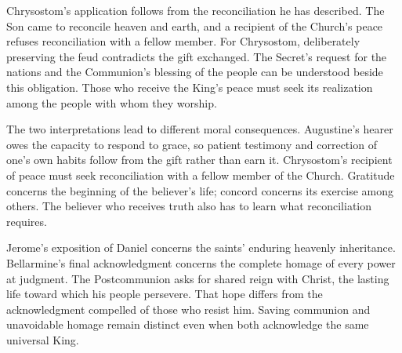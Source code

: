 Chrysostom's application follows from the reconciliation he has described. The Son came to reconcile heaven and earth, and a recipient of the Church's peace refuses reconciliation with a fellow member. For Chrysostom, deliberately preserving the feud contradicts the gift exchanged. The Secret's request for the nations and the Communion's blessing of the people can be understood beside this obligation. Those who receive the King's peace must seek its realization among the people with whom they worship.

The two interpretations lead to different moral consequences. Augustine's hearer owes the capacity to respond to grace, so patient testimony and correction of one's own habits follow from the gift rather than earn it. Chrysostom's recipient of peace must seek reconciliation with a fellow member of the Church. Gratitude concerns the beginning of the believer's life; concord concerns its exercise among others. The believer who receives truth also has to learn what reconciliation requires.

Jerome's exposition of Daniel concerns the saints' enduring heavenly inheritance. Bellarmine's final acknowledgment concerns the complete homage of every power at judgment. The Postcommunion asks for shared reign with Christ, the lasting life toward which his people persevere. That hope differs from the acknowledgment compelled of those who resist him. Saving communion and unavoidable homage remain distinct even when both acknowledge the same universal King.

